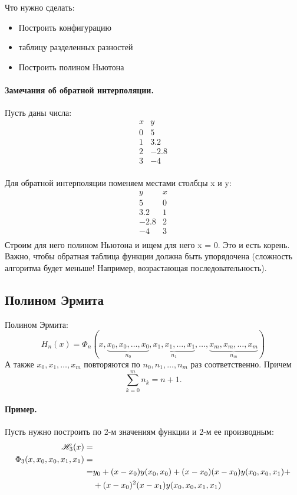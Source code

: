 Что нужно сделать:
\begin{itemize}
    \item Построить конфигурацию
    \item таблицу разделенных разностей
    \item Построить полином Ньютона
\end{itemize}


\paragraph*{Замечания об обратной интерполяции.}
Пусть даны числа:
\[
\begin{matrix}
    x & y \\
    0 & 5 \\
    1 & 3.2 \\
    2 & -2.8 \\
    3 & -4 \\
\end{matrix}
\] 

Для обратной интерполяции поменяем местами столбцы x и y:
\[
\begin{matrix}
    y & x \\
    5 & 0 \\
    3.2 & 1 \\
    -2.8 & 2 \\
    -4 & 3 \\
\end{matrix}
\] 
Строим для него полином Ньютона и ищем для него x = 0. Это и есть корень. Важно, чтобы
обратная таблица функции должна быть упорядочена (сложность алгоритма будет меньше! Например, 
возрастающая последовательность).

\subsection{Полином Эрмита}
\begin{definition}
Полином Эрмита:
\[
H_{n}(x) = \Phi_{n}(x, \underbrace{x_0,x_0,\ldots,x_0}_{n_0},
\underbrace{x_1,x_1,\ldots, x_1}_{n_1}, \ldots,
\underbrace{x_{m},x_{m}, \ldots, x_{m}}_{n_{m}})
\] 
А также $x_0, x_1, \ldots, x_{m}$ повторяются по $n_0,n_1,\ldots,n_{m}$ раз соответственно.
Причем \[
\sum\limits_{k=0}^{m}n_{k}=n+1
.\]
\end{definition}

\paragraph*{Пример.} Пусть нужно построить по 2-м значениям функции и 2-м ее производным:
$$
\begin{align*}
    \mathscr{H}_3(x) =&\\
    \Phi_3(x,x_0,x_0,x_1,x_1) =&\\
    =& y_0 + (x-x_0)y(x_0,x_0)+ (x-x_0)(x-x_0)y(x_0,x_0,x_1) +\\
            &+(x-x_0)^2(x-x_1)y(x_0,x_0,x_1,x_1)
\end{align*}
$$

